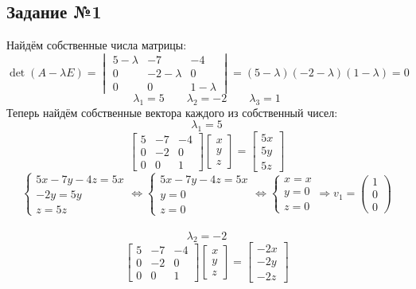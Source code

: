 \documentclass[a3paper,14pt]{extarticle}
\begin{document}
\subsection*{\centering Задание №1}
Найдём собственные числа матрицы:
$$\det(A-\lambda E) = \begin{vmatrix}
    5-\lambda & -7 & -4 \\ 0 & -2-\lambda & 0 \\ 0 & 0 & 1-\lambda
\end{vmatrix} = (5-\lambda)(-2-\lambda)(1-\lambda)=0$$
$$\lambda_1 = 5 \qquad \lambda_2 = -2 \qquad \lambda_3 = 1$$
Теперь найдём собственные вектора каждого из собственный чисел:
$$\lambda_1 = 5$$
$$\begin{bmatrix}
    5 & -7 & -4 \\ 0 & -2 & 0 \\ 0 & 0 & 1
\end{bmatrix}\begin{bmatrix}
    x \\ y \\ z
\end{bmatrix} = \begin{bmatrix}
    5x \\ 5y \\ 5z
\end{bmatrix}$$
$$\begin{cases}
    5x-7y-4z=5x \\
    -2y = 5y \\
    z = 5z
\end{cases} \Leftrightarrow \begin{cases}
    5x-7y-4z=5x \\
    y = 0 \\
    z = 0
\end{cases} \Leftrightarrow \begin{cases}
    x = x \\
    y = 0 \\
    z = 0
\end{cases} \Rightarrow v_1 = \begin{pmatrix}
    1 \\ 0 \\ 0
\end{pmatrix}$$ \,\\
$$\lambda_2 = -2$$
$$\begin{bmatrix}
    5 & -7 & -4 \\ 0 & -2 & 0 \\ 0 & 0 & 1
\end{bmatrix}\begin{bmatrix}
    x \\ y \\ z
\end{bmatrix} = \begin{bmatrix}
    -2x \\ -2y \\ -2z
\end{bmatrix}$$
\end{document}
